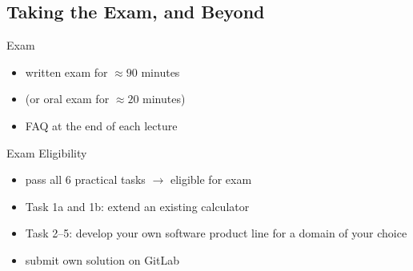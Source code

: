 


\subsection{Taking the Exam, and Beyond}

\begin{frame}[label=Exam]{\myframetitle}
	\begin{fancycolumns}
		\begin{definition}{Exam}
			\begin{itemize}
				\item written exam for $\approx 90$ minutes
				\item (or oral exam for $\approx 20$ minutes)
				\item FAQ at the end of each lecture
			\end{itemize}
		\end{definition}
		\begin{definition}{Exam Eligibility } %
			\begin{itemize}
				\item pass all 6 practical tasks $\rightarrow$ eligible for exam
				\item Task 1a and 1b: extend an existing calculator
				\item Task 2--5: develop your own software product line for a domain of your choice
				\item submit own solution on GitLab
			\end{itemize}
		\end{definition}
	\nextcolumn
		


\end{fancycolumns}
\end{frame}
